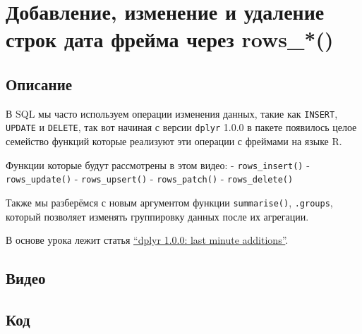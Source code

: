 \documentclass[
]{book}
\begin{document}
\hypertarget{ux434ux43eux431ux430ux432ux43bux435ux43dux438ux435-ux438ux437ux43cux435ux43dux435ux43dux438ux435-ux438-ux443ux434ux430ux43bux435ux43dux438ux435-ux441ux442ux440ux43eux43a-ux434ux430ux442ux430-ux444ux440ux435ux439ux43cux430-ux447ux435ux440ux435ux437-rows_}{%
\chapter{Добавление, изменение и удаление строк дата фрейма через rows\_*()}\label{ux434ux43eux431ux430ux432ux43bux435ux43dux438ux435-ux438ux437ux43cux435ux43dux435ux43dux438ux435-ux438-ux443ux434ux430ux43bux435ux43dux438ux435-ux441ux442ux440ux43eux43a-ux434ux430ux442ux430-ux444ux440ux435ux439ux43cux430-ux447ux435ux440ux435ux437-rows_}}

\hypertarget{ux43eux43fux438ux441ux430ux43dux438ux435-4}{%
\section{Описание}\label{ux43eux43fux438ux441ux430ux43dux438ux435-4}}

В SQL мы часто используем операции изменения данных, такие как \texttt{INSERT}, \texttt{UPDATE} и \texttt{DELETE}, так вот начиная с версии \texttt{dplyr} 1.0.0 в пакете появилось целое семейство функций которые реализуют эти операции с фреймами на языке R.

Функции которые будут рассмотрены в этом видео:
- \texttt{rows\_insert()}
- \texttt{rows\_update()}
- \texttt{rows\_upsert()}
- \texttt{rows\_patch()}
- \texttt{rows\_delete()}

Также мы разберёмся с новым аргументом функции \texttt{summarise()}, \texttt{.groups}, который позволяет изменять группировку данных после их агрегации.

В основе урока лежит статья \href{https://www.tidyverse.org/blog/2020/05/dplyr-1-0-0-last-minute-additions/}{``dplyr 1.0.0: last minute additions''}.

\hypertarget{ux432ux438ux434ux435ux43e-4}{%
\section{Видео}\label{ux432ux438ux434ux435ux43e-4}}

\hypertarget{ux43aux43eux434-4}{%
\section{Код}\label{ux43aux43eux434-4}}
\end{document}
